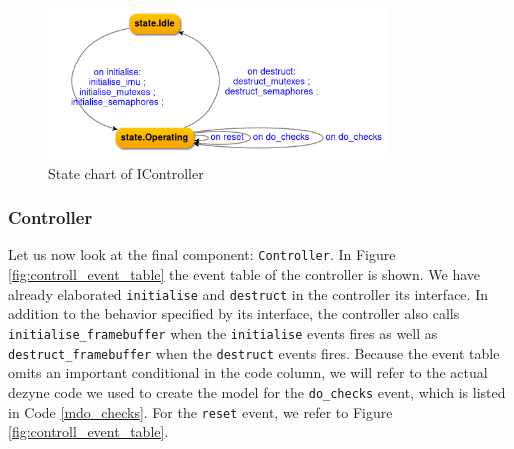 \documentclass[12pt]{scrreprt}
\begin{document}
\begin{figure}[H]
    \centering
    \includegraphics[width=0.8\textwidth]{Figures/results/modelling_figures/IController/IController_state_chart.png}
    \caption{State chart of IController}
    \label{fig:IController_state_chart}
\end{figure}

\subsubsection{Controller}
Let us now look at the final component: \texttt{Controller}. In Figure \ref{fig:controll_event_table} the event table of the controller is shown. We have already elaborated \texttt{initialise} and \texttt{destruct} in the controller its interface. In addition to the behavior specified by its interface, the controller also calls \texttt{initialise\_framebuffer} when the \texttt{initialise} events fires as well as \texttt{destruct\_framebuffer} when the \texttt{destruct} events fires. Because the event table omits an important conditional in the code column, we will refer to the actual dezyne code we used to create the model for the \texttt{do\_checks} event, which is listed in Code \ref{mdo_checks}. For the \texttt{reset} event, we refer to Figure \ref{fig:controll_event_table}.
\par
\end{document}
